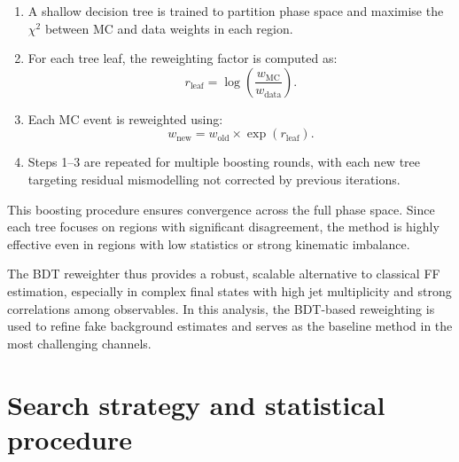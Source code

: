 \begin{enumerate}
    \item A shallow decision tree is trained to partition phase space and maximise the $\chi^2$ between MC and data weights in each region.
    \item For each tree leaf, the reweighting factor is computed as:
    \[
        r_\text{leaf} = \log \left( \frac{w_\text{MC}}{w_\text{data}} \right).
    \]
    \item Each MC event is reweighted using:
    \[
        w_\text{new} = w_\text{old} \times \exp(r_\text{leaf}).
    \]
    \item Steps 1–3 are repeated for multiple boosting rounds, with each new tree targeting residual mismodelling not corrected by previous iterations.
\end{enumerate}

This boosting procedure ensures convergence across the full phase space. Since each tree focuses on regions with significant disagreement, the method is highly effective even in regions with low statistics or strong kinematic imbalance.

The BDT reweighter thus provides a robust, scalable alternative to classical FF estimation, especially in complex final states with high jet multiplicity and strong correlations among observables. In this analysis, the BDT-based reweighting is used to refine fake background estimates and serves as the baseline method in the most challenging channels.


\section{Search strategy and statistical procedure}







